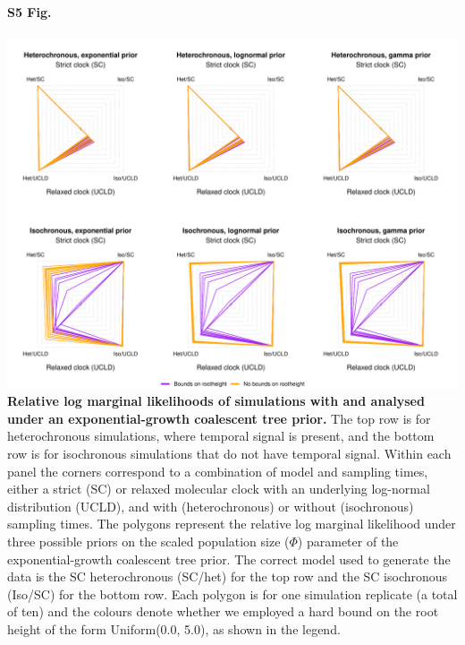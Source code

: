 \documentclass[10pt,letterpaper]{article}
\begin{document}
\paragraph*{S5 Fig.}
\label{S5_Fig}
	\begin{center}
		\includegraphics[width=14cm]{sandbox_figures/coalescent_exponential_sims.pdf}\newline
		{\textbf{Relative log marginal likelihoods of simulations with and analysed under an exponential-growth coalescent tree prior.} The top row is for heterochronous simulations, where temporal signal is present, and the bottom row is for isochronous simulations that do not have temporal signal. Within each panel the
		corners correspond to a combination of model and sampling times, either a strict (SC) or relaxed molecular clock with an underlying log-normal distribution (UCLD), and with (heterochronous) or without (isochronous) sampling times. The polygons represent the relative log marginal likelihood under three possible priors on the scaled population size ($\Phi$) parameter of the exponential-growth coalescent tree prior. The correct model used to generate the data is the SC heterochronous (SC/het) for the top row and the SC isochronous (Iso/SC) for the bottom row. Each polygon is for one simulation replicate (a total of ten) and the colours denote whether we employed a hard bound on the root height of the form Uniform(0.0, 5.0), as shown in the legend.}
	\end{center}
\end{document}
